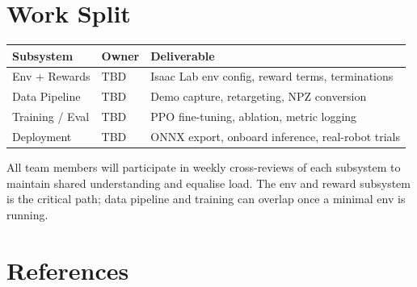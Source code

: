 \documentclass[12pt]{article}
\begin{document}
\section{Work Split}
\begin{center}
\begin{tabular}{@{}lll@{}}
\toprule
\textbf{Subsystem} & \textbf{Owner} & \textbf{Deliverable} \\
\midrule
Env + Rewards & TBD & Isaac Lab env config, reward terms, terminations \\
Data Pipeline & TBD & Demo capture, retargeting, NPZ conversion \\
Training / Eval & TBD & PPO fine-tuning, ablation, metric logging \\
Deployment & TBD & ONNX export, onboard inference, real-robot trials \\
\bottomrule
\end{tabular}
\end{center}
All team members will participate in weekly cross-reviews of each subsystem to maintain shared understanding and equalise load. The env and reward subsystem is the critical path; data pipeline and training can overlap once a minimal env is running.

\section{References}


\end{document}
